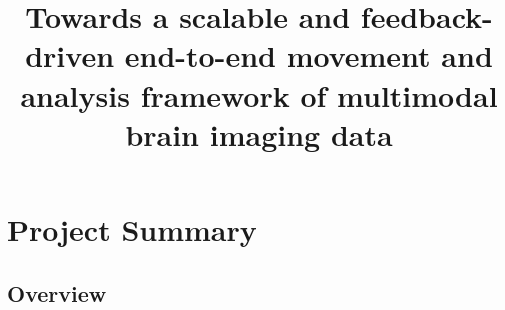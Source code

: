 \documentclass[11pt]{article}
\title{Towards a scalable and feedback-driven end-to-end movement and analysis framework of multimodal brain imaging data}
\date{}
\begin{document}
\maketitle
\clearpage
\section{Project Summary}
\subsection{Overview}
\end{document}
